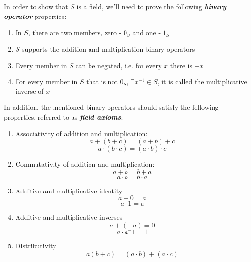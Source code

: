 \documentclass[a4paper, 12pt]{article}
\begin{document}
\begin{titlepage}
\end{titlepage}

\section{}
In order to show that $S$ is a field, we'll need to prove the following \textit{\textbf{binary operator}} properties:
\begin{enumerate}
    \item In $S$, there are two members, zero - $0_S$ and one - $1_S$
    \item $S$ supports the addition and multiplication binary operators
    \item Every member in $S$ can be negated, i.e. for every $x$ there is $-x$
    \item For every member in $S$ that is not $0_S$, $\exists{x^{-1}}\in{S}$, it is called the multiplicative inverse of $x$
\end{enumerate}
In addition, the mentioned binary operators should satisfy the following properties, referred to as \textit{\textbf{field axioms}}:
\begin{enumerate}
    \item Associativity of addition and multiplication:
        $$ a+(b+c)=(a+b)+c  $$
        $$ a\cdot(b\cdot{c})=(a\cdot{b})\cdot{c}  $$
    \item Commutativity of addition and multiplication:
        $$ a+b = b+a $$
        $$ a\cdot{b} = b\cdot{a} $$
    \item Additive and multiplicative identity
        $$ a+0=a $$
        $$ a\cdot{1}=a $$
    \item Additive and multiplicative inverses 
        $$ a + (-a) = 0 $$
        $$ a \cdot a^-1 = 1 $$
    \item Distributivity
        $$ a(b + c) = (a \cdot{b})+(a \cdot{c}) $$
\end{enumerate}
\pagebreak

\section{}
\end{document}
